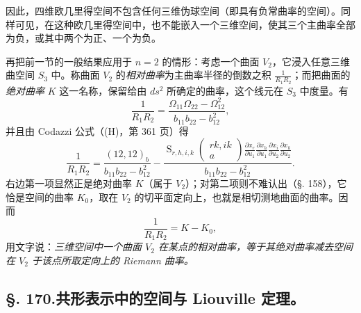 因此，四维欧几里得空间不包含任何三维伪球空间（即具有负常曲率的空间）。同样可见，在这种欧几里得空间中，也不能嵌入一个三维空间，使其三个主曲率全部为负，或其中两个为正、一个为负。

再把前一节的一般结果应用于 \(n=2\) 的情形：考虑一个曲面 \(V_2\)，它浸入任意三维曲空间 \(S_3\) 中。称曲面 \(V_2\) 的\emph{相对曲率}为主曲率半径的倒数之积 \(\frac1{R_1R_2}\)；而把曲面的\emph{绝对曲率} \(K\) 这一名称，保留给由 \(ds^2\) 所确定的曲率，这个线元在 \(S_3\) 中度量。有
\[
 \frac1{R_1R_2}=\frac{\Omega_{11}\Omega_{22}-\Omega_{12}^2}{b_{11}b_{22}-b_{12}^2},
\]
并且由 Codazzi 公式（(H)，第 361 页）得
\[
 \frac1{R_1R_2}=\frac{(12,12)_b}{b_{11}b_{22}-b_{12}^2}-
 \frac{\mathop{\mathrm{S}}_{r,h,i,k}\left(\begin{matrix}rk,ik\\a\end{matrix}\right)
 \frac{\partial x_r}{\partial u_1}\frac{\partial x_h}{\partial u_1}
 \frac{\partial x_i}{\partial u_2}\frac{\partial x_k}{\partial u_2}}
 {b_{11}b_{22}-b_{12}^2}.
\]
右边第一项显然正是绝对曲率 \(K\)（属于 \(V_2\)）；对第二项则不难认出（\S. 158），它恰是空间的曲率 \(K_0\)，取在 \(V_2\) 的切平面定向上，也就是相切测地曲面的曲率。因而
\[
\tag{37}
 \frac1{R_1R_2}=K-K_0,
\]
用文字说：\emph{三维空间中一个曲面 \(V_2\) 在某点的相对曲率，等于其绝对曲率减去空间在 \(V_2\) 于该点所取定向上的 Riemann 曲率。}

\subsection*{\S. 170.\quad 共形表示中的空间与 Liouville 定理。}

